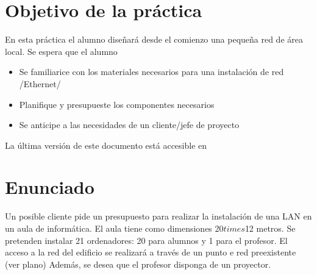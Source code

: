 
\usepackage{eurosym}


\setlength{\parindent}{1em}


\renewcommand{\hmwkTitle}{Cableado de aula}
\renewcommand{\hmwkClass}{Planificación y Administración de Redes}

\usepackage{blindtext}






\primerapagina

\section{Objetivo de la práctica}
En esta práctica el alumno diseñará desde el comienzo una pequeña red de área local. Se espera que el alumno
\begin{itemize}
\item Se familiarice con los materiales necesarios para una instalación de red /Ethernet/
\item Planifique y presupueste los componentes necesarios
\item Se anticipe a las necesidades de un cliente/jefe de proyecto
\end{itemize}

La última versión de este documento está accesible en 

\section{Enunciado}
Un posible cliente pide un presupuesto para realizar la instalación de una LAN en un aula de informática.
El aula tiene como dimensiones 20$times$12 metros. Se pretenden instalar 21 ordenadores: 20 para alumnos y 1 para el profesor. El acceso a la red del edificio se realizará a través de un punto e red preexistente (ver plano) Además, se desea que el profesor disponga de un proyector.


